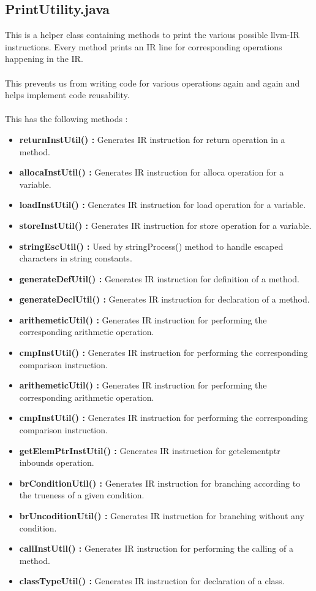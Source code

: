 \documentclass{article}
\begin{document}
\subsection{PrintUtility.java}
This is a helper class containing methods to print the various possible llvm-IR instructions. Every method prints an IR line for corresponding operations happening in the IR.\\ \\
This prevents us from writing code for various operations again and again and helps implement code reusability.\\ \\
This has the following methods :
\begin{itemize}

    \item \textbf{returnInstUtil() :} Generates IR instruction for return operation in a method.
    \item \textbf{allocaInstUtil() :} Generates IR instruction for alloca operation for a variable.
    \item \textbf{loadInstUtil() :} Generates IR instruction for load operation for a variable.
    \item \textbf{storeInstUtil() :} Generates IR instruction for store operation for a variable.
    \item \textbf{stringEscUtil() :} Used by stringProcess() method to handle escaped characters in string constants.
    \item \textbf{generateDefUtil() :} Generates IR instruction for definition of a method.
    \item \textbf{generateDeclUtil() :} Generates IR instruction for declaration of a method.
    \item \textbf{arithemeticUtil() :} Generates IR instruction for performing the corresponding arithmetic operation.
    \item \textbf{cmpInstUtil() :} Generates IR instruction for performing the corresponding comparison instruction.
    \item \textbf{arithemeticUtil() :} Generates IR instruction for performing the corresponding arithmetic operation.
    \item \textbf{cmpInstUtil() :} Generates IR instruction for performing the corresponding comparison instruction.
    \item \textbf{getElemPtrInstUtil() :} Generates IR instruction for getelementptr inbounds operation.
    \item \textbf{brConditionUtil() :} Generates IR instruction for branching according to the trueness of a given condition.
    \item \textbf{brUncoditionUtil() :} Generates IR instruction for branching without any condition.
    \item \textbf{callInstUtil() :} Generates IR instruction for performing the calling of a method.
    \item \textbf{classTypeUtil() :} Generates IR instruction for declaration of a class.
    
\end{itemize}
\end{document}
